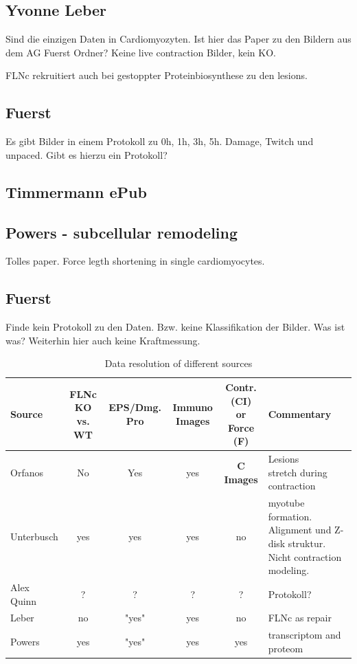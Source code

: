 \subsection*{Yvonne Leber}
Sind die einzigen Daten in Cardiomyozyten.
Ist hier das Paper zu den Bildern aus dem AG Fuerst Ordner? \newline 
Keine live contraction Bilder, kein KO.

FLNc rekruitiert auch bei gestoppter Proteinbiosynthese zu den lesions.
\subsection*{Fuerst}
Es gibt Bilder in einem Protokoll zu 0h, 1h, 3h, 5h. Damage, Twitch und unpaced. Gibt es hierzu ein Protokoll?


\subsection*{Timmermann ePub}
\subsection*{Powers - subcellular remodeling}
Tolles paper. Force legth shortening in single cardiomyocytes.


\subsection*{Fuerst}
Finde kein Protokoll zu den Daten. Bzw. keine Klassifikation der Bilder. Was ist was? Weiterhin hier auch keine Kraftmessung.




\begin{table}[h]
\centering
\begin{tabular}{|l|c|c|c|c|l|}
\hline
Source & FLNc KO vs. WT & EPS/Dmg. Pro & Immuno Images & \makecell{Contr. (CI) \\ or Force (F)} & Commentary \\
\hline
Orfanos & No & Yes & yes & \textbf{C Images}& \makecell{Lesions \\ stretch during contraction } \\
\hline
Unterbusch & yes & yes & yes & no & myotube formation. Alignment und Z-disk struktur. Nicht contraction modeling. \\
\hline
Alex Quinn & ? & ? & ? & ? & Protokoll?\\
\hline
Leber & no & "yes" & yes & no & FLNc as repair\\
\hline
Powers & yes & "yes" & yes & yes & transcriptom and proteom \\
\hline
\end{tabular}
\caption{Data resolution of different sources}
\label{tab:data_resolution}
\end{table}


